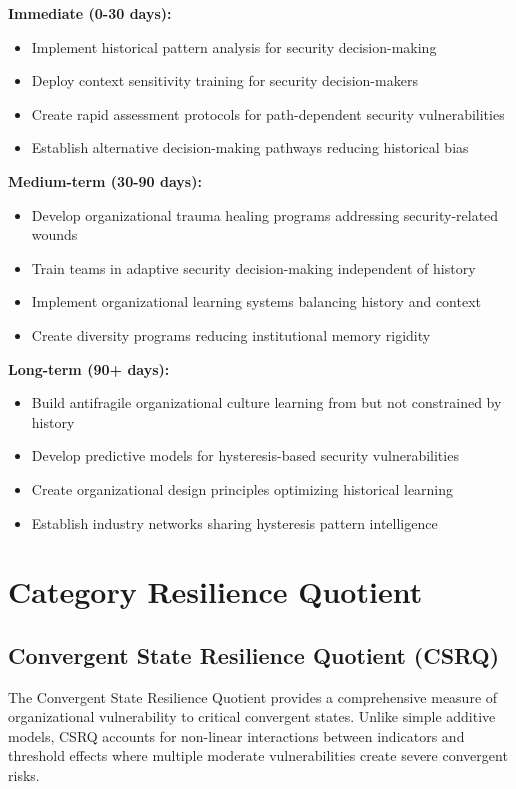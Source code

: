 \documentclass[11pt,a4paper]{article}
\begin{document}
\textbf{Immediate (0-30 days):}
\begin{itemize}
\item Implement historical pattern analysis for security decision-making
\item Deploy context sensitivity training for security decision-makers
\item Create rapid assessment protocols for path-dependent security vulnerabilities
\item Establish alternative decision-making pathways reducing historical bias
\end{itemize}

\textbf{Medium-term (30-90 days):}
\begin{itemize}
\item Develop organizational trauma healing programs addressing security-related wounds
\item Train teams in adaptive security decision-making independent of history
\item Implement organizational learning systems balancing history and context
\item Create diversity programs reducing institutional memory rigidity
\end{itemize}

\textbf{Long-term (90+ days):}
\begin{itemize}
\item Build antifragile organizational culture learning from but not constrained by history
\item Develop predictive models for hysteresis-based security vulnerabilities
\item Create organizational design principles optimizing historical learning
\item Establish industry networks sharing hysteresis pattern intelligence
\end{itemize}

\section{Category Resilience Quotient}

\subsection{Convergent State Resilience Quotient (CSRQ)}

The Convergent State Resilience Quotient provides a comprehensive measure of organizational vulnerability to critical convergent states. Unlike simple additive models, CSRQ accounts for non-linear interactions between indicators and threshold effects where multiple moderate vulnerabilities create severe convergent risks.
\end{document}

